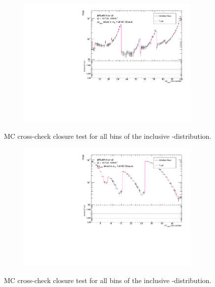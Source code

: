 \begin{figure}[htb]
  \centering
  \begin{subfigure}{.65\textwidth}\centering\includegraphics[width = 0.99\textwidth]{Figures/m4l/UnfoldingStudies/v014_closure/FullMCClosure_deltaPhiPairs_m4l.pdf}\end{subfigure}
\caption{MC cross-check closure test for all bins of the inclusive \dPhiPairs-\mFourL distribution.}
 \end{figure}

\begin{figure}[htb]
  \centering
  \begin{subfigure}{.65\textwidth}\centering\includegraphics[width = 0.99\textwidth]{Figures/m4l/UnfoldingStudies/v014_closure/FullMCClosure_deltaYPairs_m4l.pdf}\end{subfigure}
\caption{MC cross-check closure test for all bins of the inclusive \dYPairs-\mFourL distribution.}
 \end{figure}

